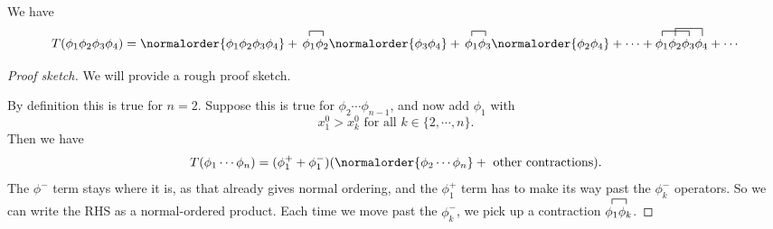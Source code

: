 \documentclass[a4paper]{article}
\begin{document}
\begin{eg}
  We have
  \[
    T(\phi_1 \phi_2 \phi_3 \phi_4) = \normalorder{\phi_1 \phi_2 \phi_3 \phi_4} + \, \contraction{}{\phi_1}{}{\phi_2}\phi_1 \phi_2 \normalorder{ \phi_3 \phi_4} + \, \contraction{}{\phi_1}{}{\phi_3}\phi_1 \phi_3 \normalorder{\phi_2 \phi_4} + \cdots + \contraction{}{\phi_1}{\phi_2}{\phi_3}\contraction[1.5ex]{\phi_1}{\phi_2}{\phi_3}{\phi_4}\phi_1\phi_2\phi_3\phi_4 + \cdots
  \]
\end{eg}

\begin{proof}[Proof sketch]
  We will provide a rough proof sketch.

  By definition this is true for $n = 2$. Suppose this is true for $\phi_2 \cdots \phi_{n - 1}$, and now add $\phi_1$ with
  \[
    x_1^0 > x_k^0 \text{ for all }k \in \{2, \cdots, n\}.
  \]
  Then we have
  \[
    T(\phi_1 \cdots \phi_n) = (\phi_1^+ + \phi_1^-)(\normalorder{\phi_2 \cdots \phi_n} + \text{ other contractions}).
  \]
  The $\phi^-$ term stays where it is, as that already gives normal ordering, and the $\phi_1^+$ term has to make its way past the $\phi_k^-$ operators. So we can write the RHS as a normal-ordered product. Each time we move past the $\phi_k^-$, we pick up a contraction $\contraction{}{\phi_1}{}{\phi_n}\phi_1\phi_k$. %
\end{proof}
\end{document}
